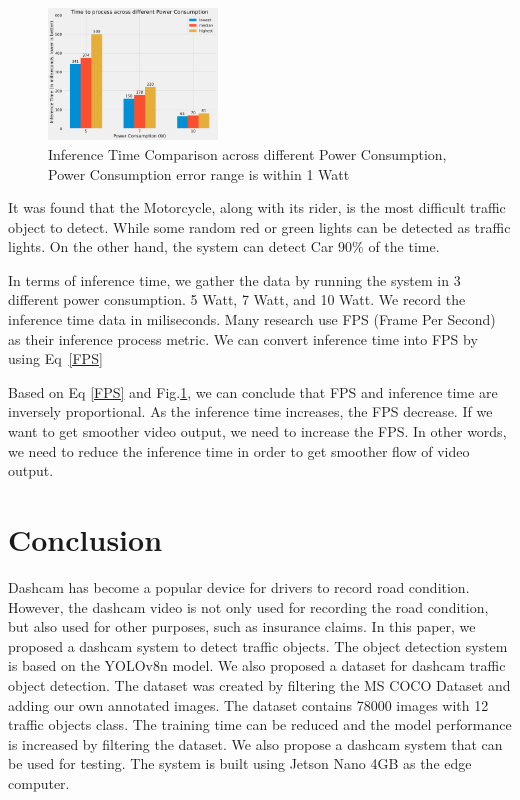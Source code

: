 \documentclass[conference]{IEEEtran}
\begin{document}
\begin{figure}[h!]
\centering
\includegraphics[width=0.4\textwidth,keepaspectratio]{inference_time_comparison.png}
\caption{Inference Time Comparison across different Power Consumption, Power Consumption error range is within 1 Watt}
\label{fig:inference_time_comparison}
\end{figure}
It was found that the Motorcycle, along with its rider, is the most difficult traffic object to detect. While some random red or green lights can be detected as traffic lights.
On the other hand, the system can detect Car 90\% of the time.

In terms of inference time, we gather the data by running the system in 3 different power consumption. 5 Watt, 7 Watt, and 10 Watt. We record the inference time data in miliseconds.
Many research use  FPS (Frame Per Second) as their inference process metric. We can convert inference time into FPS by using Eq~\eqref{FPS}

Based on Eq \eqref{FPS} and Fig.\ref{fig:inference_time_comparison}, we can conclude that FPS and inference time are inversely proportional. As the inference time increases, the FPS decrease.
If we want to get smoother video output, we need to increase the FPS. In other words, we need to reduce the inference time in order to get smoother flow of video output\@.

\section{Conclusion}
Dashcam has become a popular device for drivers to record road condition. However, the dashcam video is not only used for recording the road condition, but also used for other purposes, such as insurance claims.
In this paper, we proposed a dashcam system to detect traffic objects. The object detection system is based on the YOLOv8n model. We also proposed a dataset for dashcam traffic object detection. The dataset was created by filtering the MS COCO Dataset and adding our own annotated images. The dataset contains 78000 images with 12 traffic objects class.
The training time can be reduced and the model performance is increased by filtering the dataset.
We also propose a dashcam system that can be used for testing. The system is built using Jetson Nano 4GB as the edge computer.
\end{document}
